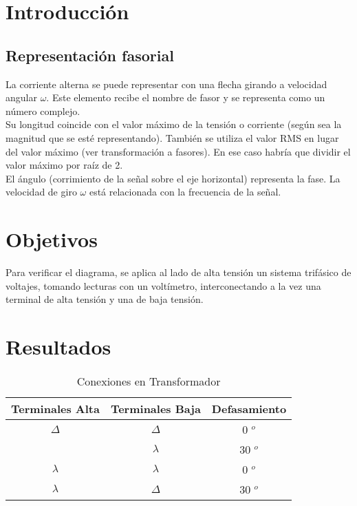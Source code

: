 \documentclass[]{article}
\begin{document}
	
	 
	

	
	
		
	\section{Introducción}
	
	\subsection{Representación fasorial}
		
	La corriente alterna se puede representar con una flecha girando a velocidad angular $\omega$. Este elemento recibe el nombre de fasor y se representa como un número complejo.\\
	
	Su longitud coincide con el valor máximo de la tensión o corriente (según sea la magnitud que se esté representando). También se utiliza el valor RMS en lugar del valor máximo (ver transformación a fasores). En ese caso habría que dividir el valor máximo por raíz de 2.\\
	
	El ángulo (corrimiento de la señal sobre el eje horizontal) representa la fase. La velocidad de giro $\omega$ está relacionada con la frecuencia de la señal.\cite{FisicaPractica}\\

		
	\section{Objetivos}
	
    Para verificar el diagrama, se aplica al lado de alta tensión un sistema trifásico de voltajes, tomando lecturas con un voltímetro, interconectando a la vez una terminal de alta tensión y una de baja tensión.
     
	\section{Resultados}
	
	
	\begin{table}[h!]
		\centering
		\begin{tabular}{|c|c|c|}
			\hline
			Terminales Alta	& Terminales Baja  & Defasamiento  \\ \hline
		$\Delta$	& $\Delta$ & 0 $^o$  \\ \hline
			& $\lambda$  &  30 $^o$ \\ \hline
		$\lambda$ 	& $\lambda$  & 0 $^o$ \\ \hline
		$\lambda$ 	& $\Delta$ &  30 $^o$\\ \hline
		
		\end{tabular}
		\caption{Conexiones en Transformador}
	\end{table}
	
\end{document}
